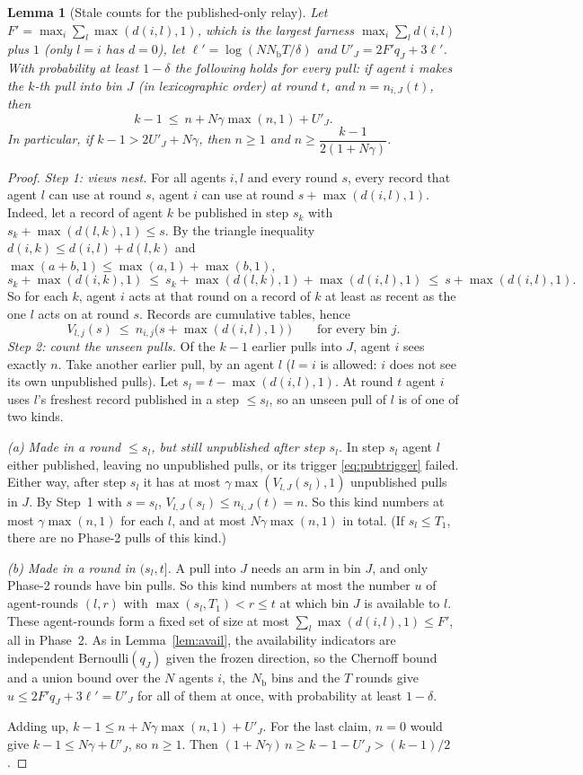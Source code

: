 \documentclass[11pt]{article}
\newtheorem{lemma}[theorem]{Lemma}
\theoremstyle{definition}
\newcommand{\Nb}{N_{\mathrm b}}
\begin{document}
\begin{lemma}[Stale counts for the published-only relay]\label{lem:pubstale}
Let $F'=\max_i\sum_l\max(d(i,l),1)$, which is the largest farness $\max_i\sum_ld(i,l)$ plus $1$ (only $l=i$ has
$d=0$), let
$\ell'=\log(N\Nb T/\delta)$ and $U'_J=2F'q_J+3\ell'$. With probability at least $1-\delta$ the following holds for every
pull: if agent $i$ makes the $k$-th pull into bin $J$ (in lexicographic order) at round $t$, and $n=n_{i,J}(t)$, then
\[
k-1\ \le\ n+N\gamma\max(n,1)+U'_J .
\]
In particular, if $k-1>2U'_J+N\gamma$, then $n\ge1$ and $n\ge\dfrac{k-1}{2(1+N\gamma)}$.
\end{lemma}
\begin{proof}
\emph{Step 1: views nest.} For all agents $i,l$ and every round $s$, every record that agent $l$ can use at round $s$,
agent $i$ can use at round $s+\max(d(i,l),1)$. Indeed, let a record of agent $k$ be published in step $s_k$ with
$s_k+\max(d(l,k),1)\le s$. By the triangle inequality $d(i,k)\le d(i,l)+d(l,k)$ and $\max(a+b,1)\le\max(a,1)+\max(b,1)$,
\[
s_k+\max(d(i,k),1)\ \le\ s_k+\max(d(l,k),1)+\max(d(i,l),1)\ \le\ s+\max(d(i,l),1).
\]
So for each $k$, agent $i$ acts at that round on a record of $k$ at least as recent as the one $l$ acts on at round $s$.
Records are cumulative tables, hence
\[
V_{l,j}(s)\ \le\ n_{i,j}\big(s+\max(d(i,l),1)\big)\qquad\text{for every bin }j.
\]
\emph{Step 2: count the unseen pulls.} Of the $k-1$ earlier pulls into $J$, agent $i$ sees exactly $n$. Take another earlier pull, by an agent $l$ ($l=i$ is
allowed: $i$ does not see its own unpublished pulls). Let $s_l=t-\max(d(i,l),1)$. At round $t$ agent $i$ uses $l$'s
freshest record published in a step $\le s_l$, so an unseen pull of $l$ is of one of two kinds.

\emph{(a) Made in a round $\le s_l$, but still unpublished after step $s_l$.} In step $s_l$ agent $l$ either
published, leaving no unpublished pulls, or its trigger \eqref{eq:pubtrigger} failed. Either way, after step $s_l$ it
has at most $\gamma\max(V_{l,J}(s_l),1)$ unpublished pulls in $J$. By Step~1 with $s=s_l$,
$V_{l,J}(s_l)\le n_{i,J}(t)=n$. So this kind numbers at most $\gamma\max(n,1)$ for each $l$, and at most
$N\gamma\max(n,1)$ in total. (If $s_l\le T_1$, there are no Phase-2 pulls of this kind.)

\emph{(b) Made in a round in $(s_l,t]$.} A pull into $J$ needs an arm in bin $J$, and only Phase-2 rounds have bin
pulls. So this kind numbers at most the number $u$ of agent-rounds $(l,r)$ with $\max(s_l,T_1)<r\le t$ at which bin $J$
is available to $l$. These agent-rounds form a fixed set of size at most $\sum_l\max(d(i,l),1)\le F'$, all in Phase~2. As in Lemma~\ref{lem:avail}, the availability indicators are independent
Bernoulli$(q_J)$ given the frozen direction, so the Chernoff bound and a union bound over the $N$ agents $i$, the $\Nb$
bins and the $T$ rounds give $u\le2F'q_J+3\ell'=U'_J$ for all of them at once, with probability at least $1-\delta$.

Adding up, $k-1\le n+N\gamma\max(n,1)+U'_J$. For the last claim, $n=0$ would give $k-1\le N\gamma+U'_J$, so $n\ge1$.
Then $(1+N\gamma)\,n\ge k-1-U'_J>(k-1)/2$.
\end{proof}
\end{document}
